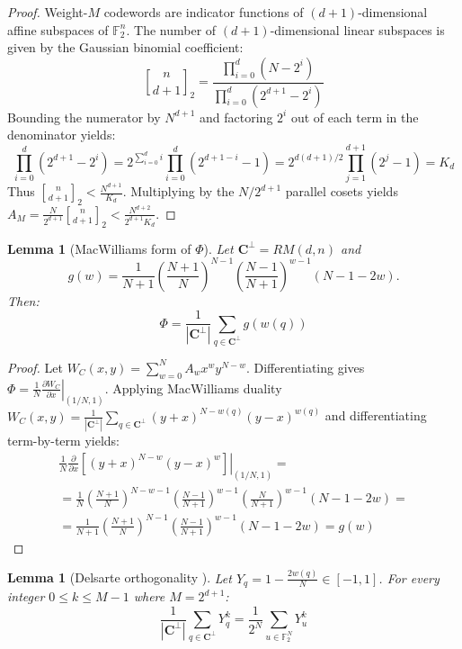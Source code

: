 \documentclass[11pt,a4paper]{article}
\newtheorem{lemma}[theorem]{Lemma}
\theoremstyle{definition}
\begin{document}
\begin{proof}
Weight-$M$ codewords are indicator functions of $(d+1)$-dimensional affine subspaces of $\mathbb{F}_2^n$. The number of $(d+1)$-dimensional linear subspaces is given by the Gaussian binomial coefficient:
\[
\genfrac{[}{]}{0pt}{}{n}{d+1}_2 = \frac{\prod_{i=0}^d (N - 2^i)}{\prod_{i=0}^d (2^{d+1} - 2^i)}
\]
Bounding the numerator by $N^{d+1}$ and factoring $2^i$ out of each term in the denominator yields:
\[
\prod_{i=0}^d (2^{d+1} - 2^i) = 2^{\sum_{i=0}^d i} \prod_{i=0}^d (2^{d+1-i} - 1) = 2^{d(d+1)/2} \prod_{j=1}^{d+1} (2^j - 1) = K_d
\]
Thus $\genfrac{[}{]}{0pt}{}{n}{d+1}_2 < \frac{N^{d+1}}{K_d}$. Multiplying by the $N/2^{d+1}$ parallel cosets yields $A_M = \frac{N}{2^{d+1}} \genfrac{[}{]}{0pt}{}{n}{d+1}_2 < \frac{N^{d+2}}{2^{d+1} K_d}$.
\end{proof}

\begin{lemma}[MacWilliams form of $\Phi$]
\label{lem:macwilliams_derivative}
Let $\mathbf{C}^\perp = RM(d, n)$ and  \[ g(w) = \frac{1}{N+1} \left(\frac{N+1}{N}\right)^{N-1} \left(\frac{N-1}{N+1}\right)^{w-1} (N - 1 - 2w). \]Then:
\[
\Phi = \frac{1}{|\mathbf{C}^\perp|} \sum_{q \in \mathbf{C}^\perp} g(w(q))
\]
\end{lemma}

\begin{proof}
Let $W_C(x, y) = \sum_{w=0}^N A_w x^w y^{N-w}$. Differentiating gives $\Phi = \frac{1}{N} \left. \frac{\partial W_C}{\partial x} \right|_{(1/N, 1)}$. Applying MacWilliams duality \cite[Ch.~5]{code} $W_C(x, y) = \frac{1}{|\mathbf{C}^\perp|} \sum_{q \in \mathbf{C}^\perp} (y+x)^{N-w(q)} (y-x)^{w(q)}$ and differentiating term-by-term yields:
\begin{multline*}
    \frac{1}{N} \left. \frac{\partial}{\partial x} \left[ (y+x)^{N-w} (y-x)^w \right] \right|_{(1/N, 1)} = \\ = \frac{1}{N} \left(\frac{N+1}{N}\right)^{N-w-1} \left(\frac{N-1}{N+1}\right)^{w-1}\left(\frac{N}{N+1}\right)^{w-1} (N - 1 - 2w) = \\ = \frac{1}{N+1} \left(\frac{N+1}{N}\right)^{N-1} \left(\frac{N-1}{N+1}\right)^{w-1} (N - 1 - 2w) = g(w)
\end{multline*}


\end{proof}

\begin{lemma}[Delsarte orthogonality \cite{delsarte}]
\label{lem:delsarte_orthogonality}
Let $Y_q = 1 - \frac{2w(q)}{N} \in [-1, 1]$. For every integer $0 \le k \le M-1$ where $M = 2^{d+1}$:
\[
\frac{1}{|\mathbf{C}^\perp|} \sum_{q \in \mathbf{C}^\perp} Y_q^k = \frac{1}{2^N} \sum_{u \in \mathbb{F}_2^N} Y_u^k
\]
\end{lemma}
\end{document}
